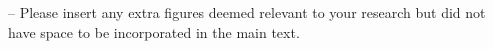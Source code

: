 -- Please insert any extra figures deemed relevant to your research but did not have space to be incorporated in the main text.